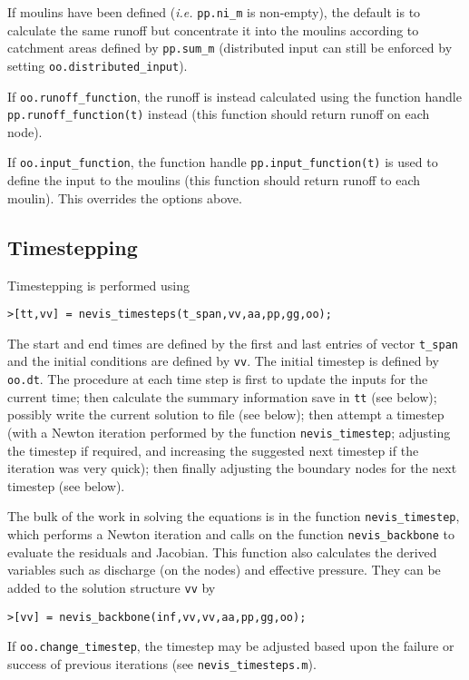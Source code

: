 \documentclass[a4paper,11pt,fleqn]{article}
\begin{document}
{{If moulins have been defined ({\it i.e.} \verb|pp.ni_m| is non-empty), the default is to calculate the same runoff but concentrate it into the moulins according to catchment areas defined by \verb|pp.sum_m| (distributed input can still be enforced by setting \verb|oo.distributed_input|).

If \verb|oo.runoff_function|, the runoff is instead calculated using the function handle \verb|pp.runoff_function(t)| instead (this function should return runoff on each node).

If \verb|oo.input_function|, the function handle \verb|pp.input_function(t)| is used to define the input to the moulins (this function should return runoff to each moulin). This overrides the options above.


\subsection*{Timestepping}

Timestepping is performed using
\begin{verbatim}
>[tt,vv] = nevis_timesteps(t_span,vv,aa,pp,gg,oo);
\end{verbatim}
The start and end times are defined by the first and last entries of vector \verb|t_span| and the initial conditions are defined by \verb|vv|.  The initial timestep is defined by \verb|oo.dt|.  The procedure at each time step is first to update the inputs for the current time; then calculate the summary information save in \verb|tt| (see below); possibly write the current solution to file (see below); then attempt a timestep (with a Newton iteration performed by the function \verb|nevis_timestep|; adjusting the timestep if required, and increasing the suggested next timestep if the iteration was very quick); then finally adjusting the boundary nodes for the next timestep (see below). 

The bulk of the work in solving the equations is in the function \verb|nevis_timestep|, which performs a Newton iteration and calls on the function \verb|nevis_backbone| to evaluate the residuals and Jacobian.  This function also calculates the derived variables such as discharge (on the nodes) and effective pressure.  They can be added to the solution structure \verb|vv| by
\begin{verbatim}
>[vv] = nevis_backbone(inf,vv,vv,aa,pp,gg,oo);
\end{verbatim}
If \verb|oo.change_timestep|, the timestep may be adjusted based upon the failure or success of previous iterations (see \verb|nevis_timesteps.m|).  

}}
\end{document}

